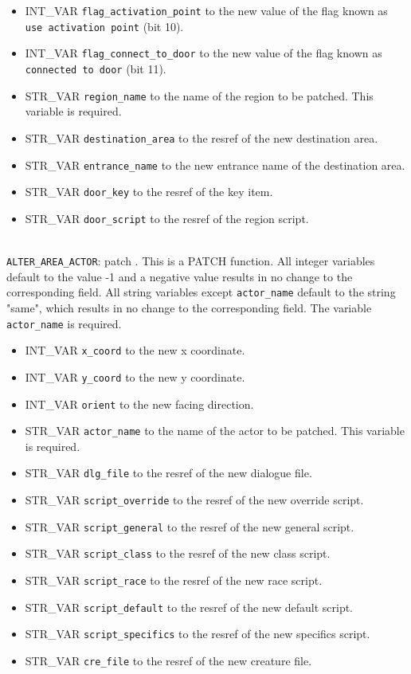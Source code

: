\documentclass{article}
\def\t#1{{\tt #1}}
\begin{document}
\begin{itemize}
\item INT_VAR \verb+flag_activation_point+ to the new value of the flag known as \t{use activation point} (bit 10).
\item INT_VAR \verb+flag_connect_to_door+ to the new value of the flag known as \t{connected to door} (bit 11).
\item STR_VAR \verb+region_name+ to the name of the region to be patched. This variable is required.
\item STR_VAR \verb+destination_area+ to the resref of the new destination area.
\item STR_VAR \verb+entrance_name+ to the new entrance name of the destination area.
\item STR_VAR \verb+door_key+ to the resref of the key item.
\item STR_VAR \verb+door_script+ to the resref of the region script.
\end{itemize}
\\

\verb+ALTER_AREA_ACTOR+: patch .
This is a PATCH function. All integer variables default to the value -1 and a negative value results in no change to the corresponding field. All string variables except \verb+actor_name+ default to the string "same", which results in no change to the corresponding field. The variable \verb+actor_name+ is required.
\begin{itemize}
\item INT_VAR \verb+x_coord+ to the new x coordinate.
\item INT_VAR \verb+y_coord+ to the new y coordinate.
\item INT_VAR \verb+orient+ to the new facing direction.
\item STR_VAR \verb+actor_name+ to the name of the actor to be patched. This variable is required.
\item STR_VAR \verb+dlg_file+ to the resref of the new dialogue file.
\item STR_VAR \verb+script_override+ to the resref of the new override script.
\item STR_VAR \verb+script_general+ to the resref of the new general script.
\item STR_VAR \verb+script_class+ to the resref of the new class script.
\item STR_VAR \verb+script_race+ to the resref of the new race script.
\item STR_VAR \verb+script_default+ to the resref of the new default script.
\item STR_VAR \verb+script_specifics+ to the resref of the new specifics script.
\item STR_VAR \verb+cre_file+ to the resref of the new creature file.
\end{itemize}
\\
\end{document}
